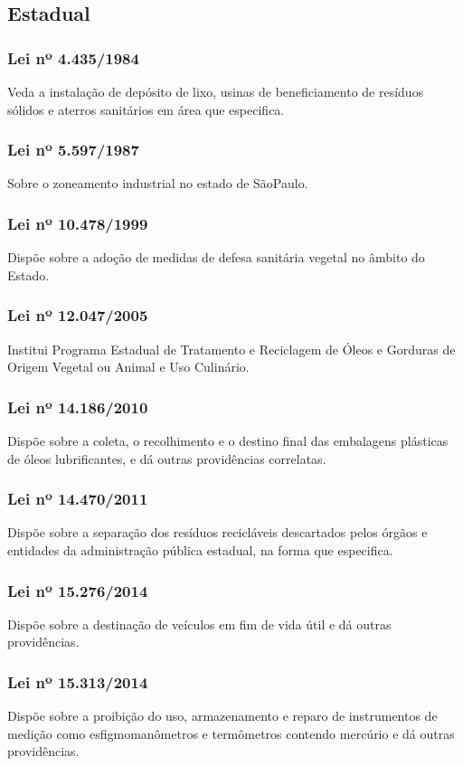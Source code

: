 \begin{subapend}
	\subsection{Estadual}
	\begin{subsubapend}
		\subsubsection{Lei nº 4.435/1984}
		Veda a instalação de depósito de lixo, usinas de beneficiamento de resíduos sólidos e aterros sanitários em área que especifica.
		\subsubsection{Lei nº 5.597/1987}
		Sobre o zoneamento industrial no estado de SãoPaulo.
		\subsubsection{Lei nº 10.478/1999}
		Dispõe sobre a adoção de medidas de defesa sanitária vegetal no âmbito do Estado.
		\subsubsection{Lei nº 12.047/2005}
		Institui Programa Estadual de Tratamento e Reciclagem de Óleos e Gorduras de Origem Vegetal ou Animal e Uso Culinário.
		\subsubsection{Lei nº 14.186/2010}
		Dispõe sobre a coleta, o recolhimento e o destino final das embalagens plásticas de óleos lubrificantes, e dá outras providências correlatas.
		\subsubsection{Lei nº 14.470/2011}
		Dispõe sobre a separação dos resíduos recicláveis descartados pelos órgãos e entidades da administração pública estadual, na forma que especifica.
		\subsubsection{Lei nº 15.276/2014}
		Dispõe sobre a destinação de veículos em fim de vida útil e dá outras providências.
		\subsubsection{Lei nº 15.313/2014}
		Dispõe sobre a proibição do uso, armazenamento e reparo de instrumentos de medição como esfigmomanômetros e termômetros contendo mercúrio e dá outras providências.

\end{subsubapend}
\end{subapend}
